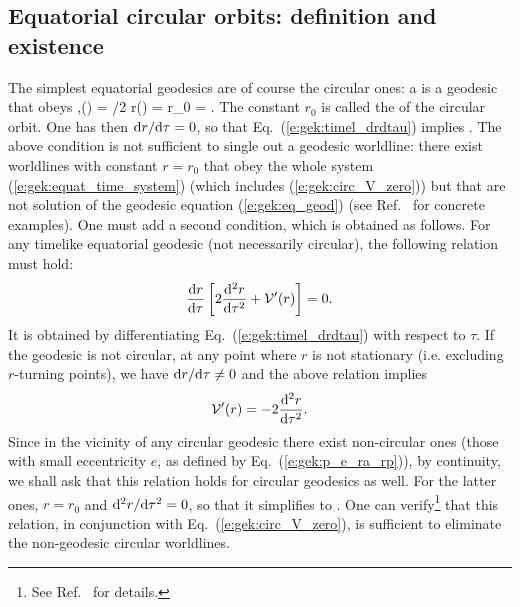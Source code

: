 \subsection{Equatorial circular orbits: definition and existence} \label{s:gek:existence_circ_orb}

The simplest equatorial geodesics are of course the circular ones:
a 
is a geodesic that obeys
\be \label{e:gek:def_circular_orbit}
    \forall\tau\in{},\quad \theta(\tau) = \pi/2 \qand r(\tau) = r_0 =  .
\ee
The constant $r_0$ is called the  of the circular
orbit.
One has then $\mathrm{d} r/\mathrm{d}\tau = 0$, so that Eq.~(\ref{e:gek:timel_drdtau}) implies
\be \label{e:gek:circ_V_zero}
    .
\ee
The above condition is not sufficient to single out a geodesic worldline:
there exist worldlines with constant $r=r_0$ that obey the whole system
(\ref{e:gek:equat_time_system}) (which includes (\ref{e:gek:circ_V_zero}))
but that are not solution of the
geodesic equation (\ref{e:gek:eq_geod})
(see Ref.~\cite{Vanae20} for concrete examples). One must add a second condition, which
is obtained as follows. For any timelike equatorial geodesic (not necessarily
circular), the following relation must hold:
\[
    \frac{\mathrm{d} r}{\mathrm{d} \tau} \left[ 2 \frac{\mathrm{d}^2 r}{\mathrm{d} {\tau}^2} + \mathcal{V}'(r) \right] = 0 .
\]
It is obtained by differentiating Eq.~(\ref{e:gek:timel_drdtau}) with respect
to $\tau$. If the geodesic is not circular, at any point where $r$ is not
stationary (i.e. excluding $r$-turning points), we have $\mathrm{d} r/\mathrm{d}\tau \neq 0$
and the above relation implies
\[
    \mathcal{V}'(r) = - 2 \frac{\mathrm{d}^2 r}{\mathrm{d} {\tau}^2} .
\]
Since in the vicinity of any circular geodesic there exist non-circular ones
(those with small eccentricity $e$, as defined by Eq.~(\ref{e:gek:p_e_ra_rp})), by continuity, we shall ask that this relation
holds for circular geodesics as well. For the latter ones, $r=r_0$ and
$\mathrm{d}^2 r/\mathrm{d}\tau^2 = 0$, so that it simplifies to
\be \label{e:gek:circ_derV_zero}
    .
\ee
One can verify\footnote{See Ref.~\cite{Vanae20} for details.} that this
relation, in conjunction with Eq.~(\ref{e:gek:circ_V_zero}), is sufficient
to eliminate the non-geodesic circular worldlines.

